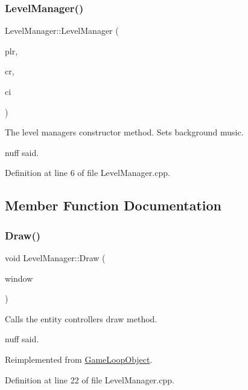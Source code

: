 \subsubsection{\texorpdfstring{Level\+Manager()}{LevelManager()}}
{\footnotesize\ttfamily Level\+Manager\+::\+Level\+Manager (\begin{DoxyParamCaption}\item[{\hyperlink{class_player}{Player} \&}]{plr,  }\item[{\hyperlink{class_cursor}{Cursor} \&}]{cr,  }\item[{\hyperlink{struct_controls_input}{Controls\+Input} \&}]{ci }\end{DoxyParamCaption})}



The level manager\textquotesingle{}s constructor method. Sets background music. 

\textquotesingle{}nuff said. 

Definition at line 6 of file Level\+Manager.\+cpp.



\subsection{Member Function Documentation}
\mbox{\label{class_level_manager_a35cafa518fbbb9fdedfc6a587772bed9}} 
\subsubsection{\texorpdfstring{Draw()}{Draw()}}
{\footnotesize\ttfamily void Level\+Manager\+::\+Draw (\begin{DoxyParamCaption}\item[{sf\+::\+Render\+Window \&}]{window }\end{DoxyParamCaption})\hspace{0.3cm}{\ttfamily [virtual]}}



Calls the entity controller\textquotesingle{}s draw method. 

\textquotesingle{}nuff said. 

Reimplemented from \hyperlink{class_game_loop_object_a0572a88e5b98fa8a41078260d152202d}{Game\+Loop\+Object}.



Definition at line 22 of file Level\+Manager.\+cpp.

